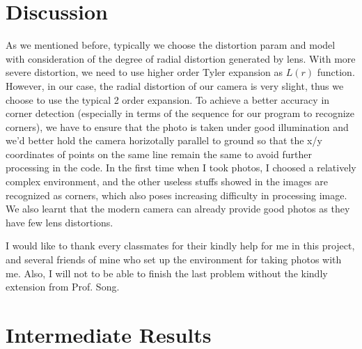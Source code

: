 \documentclass[conference]{IEEEtran}
\begin{document}
\section{Discussion}
As we mentioned before, typically we choose the distortion param and model with consideration of the degree of radial distortion generated by lens. With more severe distortion, we need to use higher order Tyler expansion as $L(r)$ function. However, in our case, the radial distortion of our camera is very slight, thus we choose to use the typical 2 order expansion. To achieve a better accuracy in corner detection (especially in terms of the sequence for our program to recognize corners), we have to ensure that the photo is taken under good illumination and we'd better hold the camera horizotally parallel to ground so that the x/y coordinates of points on the same line remain the same to avoid further processing in the code. In the first time when I took photos, I choosed a relatively complex environment, and the other useless stuffs showed in the images are recognized as corners, which also poses increasing difficulty in processing image. We also learnt that the modern camera can already provide good photos as they have few lens distortions.

I would like to thank every classmates for their kindly help for me in this project, and several friends of mine who set up the environment for taking photos with me. Also, I will not to be able to finish the last problem without the kindly extension from Prof. Song.
\onecolumn

\section{Intermediate Results}
\end{document}
